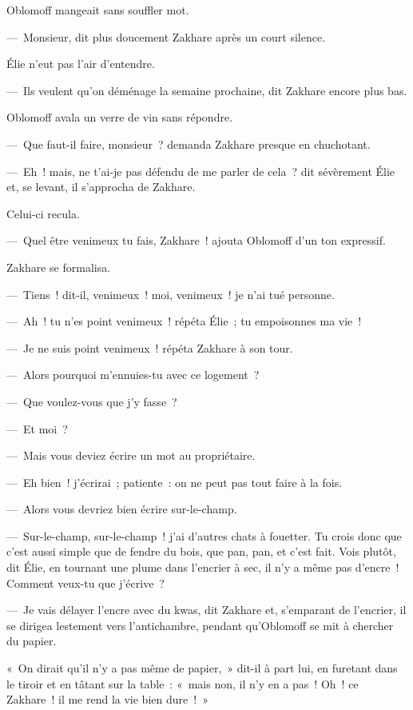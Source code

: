 \documentclass[french,twoside]{book} %
\begin{document}
Oblomoff mangeait sans souffler mot.\par
— Monsieur, dit plus doucement Zakhare après un court silence.\par
Élie n’eut pas l’air d’entendre.\par
— Ils veulent qu’on déménage la semaine prochaine, dit Zakhare encore plus bas.\par
Oblomoff avala un verre de vin sans répondre.\par
— Que faut-il faire, monsieur ? demanda Zakhare presque en chuchotant.\par
— Eh ! mais, ne t’ai-je pas défendu de me parler de cela ? dit sévèrement Élie et, se levant, il s’approcha de Zakhare.\par
Celui-ci recula.\par
— Quel être venimeux tu fais, Zakhare ! ajouta Oblomoff d’un ton expressif.\par
Zakhare se formalisa.\par
— Tiens ! dit-il, venimeux ! moi, venimeux ! je n’ai tué personne.\par
— Ah ! tu n’es point venimeux ! répéta Élie ; tu empoisonnes ma vie !\par
— Je ne suis point venimeux ! répéta Zakhare à son tour.\par
— Alors pourquoi m’ennuies-tu avec ce logement ?\par
— Que voulez-vous que j’y fasse ?\par
— Et moi ?\par
— Mais vous deviez écrire un mot au propriétaire.\par
— Eh bien ! j’écrirai ; patiente : on ne peut pas tout faire à la fois.\par
— Alors vous devriez bien écrire sur-le-champ.\par
— Sur-le-champ, sur-le-champ ! j’ai d’autres chats à fouetter. Tu crois donc que c’est aussi simple que de fendre du bois, que pan, pan, et c’est fait. Vois plutôt, dit Élie, en tournant une plume dans l’encrier à sec, il n’y a même pas d’encre ! Comment veux-tu que j’écrive ?\par
— Je vais délayer l’encre avec du kwas, dit Zakhare et, s’emparant de l’encrier, il se dirigea lestement vers l’antichambre, pendant qu’Oblomoff se mit à chercher du papier.\par
« On dirait qu’il n’y a pas même de papier, » dit-il à part lui, en furetant dans le tiroir et en tâtant sur la table : « mais non, il n’y en a pas ! Oh ! ce Zakhare ! il me rend la vie bien dure ! »\par
\end{document}
